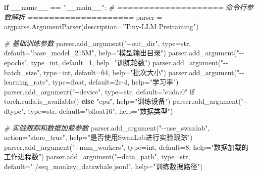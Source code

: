 \documentclass[
]{article}
\newenvironment{Shaded}{}{}
\newcommand{\BuiltInTok}[1]{\textcolor[rgb]{0.00,0.50,0.00}{#1}}
\newcommand{\CommentTok}[1]{\textcolor[rgb]{0.38,0.63,0.69}{\textit{#1}}}
\newcommand{\ControlFlowTok}[1]{\textcolor[rgb]{0.00,0.44,0.13}{\textbf{#1}}}
\newcommand{\DecValTok}[1]{\textcolor[rgb]{0.25,0.63,0.44}{#1}}
\newcommand{\FloatTok}[1]{\textcolor[rgb]{0.25,0.63,0.44}{#1}}
\newcommand{\NormalTok}[1]{#1}
\newcommand{\OperatorTok}[1]{\textcolor[rgb]{0.40,0.40,0.40}{#1}}
\newcommand{\StringTok}[1]{\textcolor[rgb]{0.25,0.44,0.63}{#1}}
\newcommand{\VariableTok}[1]{\textcolor[rgb]{0.10,0.09,0.49}{#1}}
\begin{document}
\begin{Shaded}
\begin{Highlighting}[]
\ControlFlowTok{if} \VariableTok{\_\_name\_\_} \OperatorTok{==} \StringTok{"\_\_main\_\_"}\NormalTok{:}
    \CommentTok{\# ==================== 命令行参数解析 ====================}
\NormalTok{    parser }\OperatorTok{=}\NormalTok{ argparse.ArgumentParser(description}\OperatorTok{=}\StringTok{"Tiny{-}LLM Pretraining"}\NormalTok{)}
    
    \CommentTok{\# 基础训练参数}
\NormalTok{    parser.add\_argument(}\StringTok{"{-}{-}out\_dir"}\NormalTok{, }\BuiltInTok{type}\OperatorTok{=}\BuiltInTok{str}\NormalTok{, default}\OperatorTok{=}\StringTok{"base\_model\_215M"}\NormalTok{, }\BuiltInTok{help}\OperatorTok{=}\StringTok{"模型输出目录"}\NormalTok{)}
\NormalTok{    parser.add\_argument(}\StringTok{"{-}{-}epochs"}\NormalTok{, }\BuiltInTok{type}\OperatorTok{=}\BuiltInTok{int}\NormalTok{, default}\OperatorTok{=}\DecValTok{1}\NormalTok{, }\BuiltInTok{help}\OperatorTok{=}\StringTok{"训练轮数"}\NormalTok{)}
\NormalTok{    parser.add\_argument(}\StringTok{"{-}{-}batch\_size"}\NormalTok{, }\BuiltInTok{type}\OperatorTok{=}\BuiltInTok{int}\NormalTok{, default}\OperatorTok{=}\DecValTok{64}\NormalTok{, }\BuiltInTok{help}\OperatorTok{=}\StringTok{"批次大小"}\NormalTok{)}
\NormalTok{    parser.add\_argument(}\StringTok{"{-}{-}learning\_rate"}\NormalTok{, }\BuiltInTok{type}\OperatorTok{=}\BuiltInTok{float}\NormalTok{, default}\OperatorTok{=}\FloatTok{2e{-}4}\NormalTok{, }\BuiltInTok{help}\OperatorTok{=}\StringTok{"学习率"}\NormalTok{)}
\NormalTok{    parser.add\_argument(}\StringTok{"{-}{-}device"}\NormalTok{, }\BuiltInTok{type}\OperatorTok{=}\BuiltInTok{str}\NormalTok{, default}\OperatorTok{=}\StringTok{"cuda:0"} \ControlFlowTok{if}\NormalTok{ torch.cuda.is\_available() }\ControlFlowTok{else} \StringTok{"cpu"}\NormalTok{, }\BuiltInTok{help}\OperatorTok{=}\StringTok{"训练设备"}\NormalTok{)}
\NormalTok{    parser.add\_argument(}\StringTok{"{-}{-}dtype"}\NormalTok{, }\BuiltInTok{type}\OperatorTok{=}\BuiltInTok{str}\NormalTok{, default}\OperatorTok{=}\StringTok{"bfloat16"}\NormalTok{, }\BuiltInTok{help}\OperatorTok{=}\StringTok{"数据类型"}\NormalTok{)}
    
    \CommentTok{\# 实验跟踪和数据加载参数}
\NormalTok{    parser.add\_argument(}\StringTok{"{-}{-}use\_swanlab"}\NormalTok{, action}\OperatorTok{=}\StringTok{"store\_true"}\NormalTok{, }\BuiltInTok{help}\OperatorTok{=}\StringTok{"是否使用SwanLab进行实验跟踪"}\NormalTok{)}
\NormalTok{    parser.add\_argument(}\StringTok{"{-}{-}num\_workers"}\NormalTok{, }\BuiltInTok{type}\OperatorTok{=}\BuiltInTok{int}\NormalTok{, default}\OperatorTok{=}\DecValTok{8}\NormalTok{, }\BuiltInTok{help}\OperatorTok{=}\StringTok{"数据加载的工作进程数"}\NormalTok{)}
\NormalTok{    parser.add\_argument(}\StringTok{"{-}{-}data\_path"}\NormalTok{, }\BuiltInTok{type}\OperatorTok{=}\BuiltInTok{str}\NormalTok{, default}\OperatorTok{=}\StringTok{"./seq\_monkey\_datawhale.jsonl"}\NormalTok{, }\BuiltInTok{help}\OperatorTok{=}\StringTok{"训练数据路径"}\NormalTok{)}
    

\end{Highlighting}
\end{Shaded}
\end{document}
